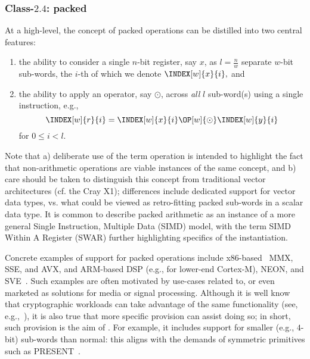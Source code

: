 
\subsubsection{Class-$2.4$: packed}
\label{sec:bg:feature:2:4}

At a high-level, the concept of packed operations can be distilled into two 
central features:

\begin{enumerate}
\item the ability to consider a single $n$-bit register, 
      say $x$, 
      as $l = \frac{n}{w}$ separate $w$-bit sub-words, the $i$-th of which
      we denote
      $
      \INDEX[w]{x}{i} ,
      $
      and
\item the ability to apply an operator,
      say $\odot$,
      across {\em all} $l$ sub-word(s) using a single instruction, e.g.,
      \[
      \INDEX[w]{r}{i} = \INDEX[w]{x}{i} \OP[w]{\odot} \INDEX[w]{y}{i}
      \]
      for $0 \leq i < l$.
\end{enumerate}

\noindent
Note that
a) deliberate use of the term operation is intended to highlight the fact 
   that non-arithmetic operations are viable instances of the same concept,
   and
b) care should be taken to distinguish this concept from traditional vector 
   architectures
   (cf. the Cray X1);
   differences include dedicated support for vector data types, vs. what
   could be viewed as retro-fitting packed sub-words in a scalar data type.
It is common to describe packed arithmetic as an instance of a more general
Single Instruction, Multiple Data (SIMD) model, with the term SIMD Within 
A Register (SWAR) further highlighting specifics of the instantiation.

Concrete examples of support for packed operations include
x86-based~\cite[Section 2.2.7]{SCARV:X86:2:18} MMX, SSE, and AVX,
and
ARM-based DSP (e.g., for lower-end Cortex-M), NEON, and SVE~\cite{SCARV:SBBEEGHMMPRRW:17}.
Such examples are often motivated by use-cases related to, or even marketed 
as solutions for media or signal processing.  Although it is well know that
cryptographic workloads can take advantage of the same functionality
(see, e.g.,~\cite{SCARV:Hamburg:09,SCARV:BerSch:12}),
it is also true that more specific provision can assist doing so; in short,
such provision is the aim of \XCRYPTO.  For example, it includes support for
smaller (e.g., $4$-bit) sub-words than normal: this aligns with the demands
of symmetric primitives such as PRESENT~\cite{SCARV:BKLPPRSV:07}.

